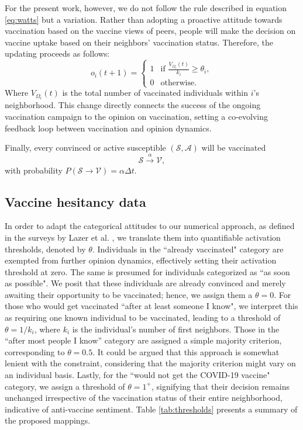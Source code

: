\documentclass[
 reprint,
 amsmath,amssymb,
 aps,
]{revtex4-2}
\begin{document}
For the present work, however, we do not follow the rule described in equation \ref{eq:watts} but a variation. Rather than adopting a proactive attitude towards vaccination based on the vaccine views of peers, people will make the decision on vaccine uptake based on their neighbors' vaccination status. Therefore, the updating proceeds as follows:
\begin{equation}
o_i(t+1)=
    \begin{cases}
        1 & \text{if } \frac{V_{\Omega_i}(t)}{k_i}\geq\theta_i,\\
        0 & \text{otherwise}.
    \end{cases}
\label{eq:watts_mod}
\end{equation}
Where $V_{\Omega_i}(t)$ is the total number of vaccinated individuals within $i$'s neighborhood. This change directly connects the success of the ongoing vaccination campaign to the opinion on vaccination, setting a co-evolving feedback loop between vaccination and opinion dynamics. 

Finally, every convinced or active susceptible $(\mathcal{S},\mathcal{A})$ will be vaccinated
\begin{equation}
    \mathcal{S\xrightarrow{\alpha} V},
\end{equation}
with probability $P(\mathcal{S}\to\mathcal{V})=\alpha\Delta t$.

\subsection{Vaccine hesitancy data}
\label{subsec:hesitancy}

In order to adapt the categorical attitudes to our numerical approach, as defined in the surveys by Lazer et al. \cite{lazer2021covid}, we translate them into quantifiable activation thresholds, denoted by $\theta$. Individuals in the ``already vaccinated" category are exempted from further opinion dynamics, effectively setting their activation threshold at zero. The same is presumed for individuals categorized as ``as soon as possible". We posit that these individuals are already convinced and merely awaiting their opportunity to be vaccinated; hence, we assign them a $\theta=0$. For those who would get vaccinated ``after at least someone I know", we interpret this as requiring one known individual to be vaccinated, leading to a threshold of $\theta=1/k_i$, where $k_i$ is the individual's number of first neighbors. Those in the ``after most people I know'' category are assigned a simple majority criterion, corresponding to $\theta=0.5$. It could be argued that this approach is somewhat lenient with the constraint, considering that the majority criterion might vary on an individual basis.  Lastly, for the ``would not get the COVID-19 vaccine" category, we assign a threshold of $\theta=1^+$, signifying that their decision remains unchanged irrespective of the vaccination status of their entire neighborhood, indicative of anti-vaccine sentiment. Table \ref{tab:thresholds} presents a summary of the proposed mappings.
\end{document}
